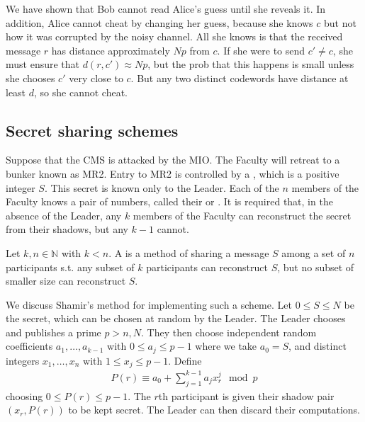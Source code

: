 We have shown that Bob cannot read Alice's guess until she reveals it.
In addition, Alice cannot cheat by changing her guess, because she knows $c$ but not how it was corrupted by the noisy channel.
All she knows is that the received message $r$ has distance approximately $Np$ from $c$.
If she were to send $c' \neq c$, she must ensure that $d(r,c') \approx Np$, but the prob that this happens is small unless she chooses $c'$ very close to $c$.
But any two distinct codewords have distance at least $d$, so she cannot cheat.

\subsection{Secret sharing schemes}
Suppose that the CMS is attacked by the MIO.
The Faculty will retreat to a bunker known as MR2.
Entry to MR2 is controlled by a , which is a positive integer $S$.
This secret is known only to the Leader.
Each of the $n$ members of the Faculty knows a pair of numbers, called their  or .
It is required that, in the absence of the Leader, any $k$ members of the Faculty can reconstruct the secret from their shadows, but any $k-1$ cannot.
\begin{definition}
    Let $k, n \in \mathbb N$ with $k < n$.
    A  is a method of sharing a message $S$ among a set of $n$ participants s.t. any subset of $k$ participants can reconstruct $S$, but no subset of smaller size can reconstruct $S$.
\end{definition}
We discuss Shamir's method for implementing such a scheme.
Let $0 \leq S \leq N$ be the secret, which can be chosen at random by the Leader.
The Leader chooses and publishes a prime $p > n, N$.
They then choose independent random coefficients $a_1, \dots, a_{k-1}$ with $0 \leq a_j \leq p-1$ where we take $a_0 = S$, and distinct integers $x_1, \dots, x_n$ with $1 \leq x_j \leq p-1$.
Define
\begin{align*}
    P(r) \equiv a_0 + \sum_{j=1}^{k-1} a_j x_r^j \mod p
\end{align*}
choosing $0 \leq P(r) \leq p-1$.
The $r$th participant is given their shadow pair $(x_r, P(r))$ to be kept secret.
The Leader can then discard their computations.

